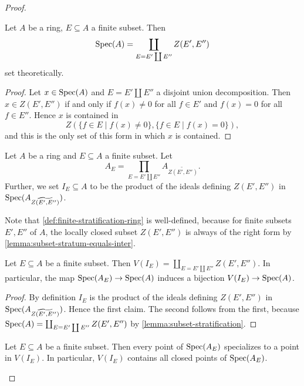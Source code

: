 \begin{proof}
\begin{lemma}
    Let $A$ be a ring, $E \subseteq A$ a finite subset. Then
    \[
        \mathrm{Spec}(A) = \coprod_{E = E' \coprod E''} Z(E', E'')
    \] set theoretically.
    \label{lemma:subset-stratification}
\end{lemma}

\begin{proof}
    Let $x \in \mathrm{Spec}(A)$ and $E = E' \coprod E''$ a disjoint union decomposition. Then
    $x \in Z(E', E'')$ if and only if $f(x) \neq 0$ for all $f \in E'$ and $f(x) = 0$
    for all $f \in E''$. Hence $x$ is contained in
    \[
    Z(\{ f \in E  \mid f(x) \neq 0\}, \{f \in E  \mid f(x) = 0\})
    ,\] and this is the only set of this form in which $x$ is contained.
\end{proof}

\begin{definition}
    Let $A$ be a ring and $E \subseteq A$ a finite subset. Let
    \[
    A_{E} = \prod_{E = E' \coprod E''} A_{\widetilde{Z(E', E'')}}
    .\]
    Further, we set $I_E \subseteq A$ to be the product of the ideals
    defining $Z(E', E'')$ in $\mathrm{Spec}(A_{\widetilde{Z(E', E'')}})$.
    \label{def:finite-stratification-ring}
\end{definition}

Note that \ref{def:finite-stratification-ring} is well-defined, because for finite
subsets $E', E''$ of $A$, the locally closed subset $Z(E', E'')$ is always
of the right form by \ref{lemma:subset-stratum-equals-inter}.

\begin{lemma}
    Let $E \subseteq A$ be a finite subset. Then
    $V(I_E) = \coprod_{E = E' \coprod E''} Z(E', E'')$. In particular,
    the map $\mathrm{Spec}(A_E) \to \mathrm{Spec}(A)$ induces a bijection $V(I_E) \to \mathrm{Spec}(A)$.
    \label{lemma:finite-stratification-ideal-bijection}
\end{lemma}

\begin{proof}
    By definition $I_E$ is the product of the ideals defining $Z(E', E'')$ in
    $\mathrm{Spec}(A_{\widetilde{Z(E', E'')}})$. Hence the first claim. The second
    follows from the first, because $\mathrm{Spec}(A) = \coprod_{E = E' \coprod E''} Z(E', E'')$ by
    \ref{lemma:subset-stratification}.
\end{proof}

\begin{lemma}
    Let $E \subseteq A$ be a finite subset. Then every point of $\mathrm{Spec}(A_E)$ specializes
    to a point in $V(I_E)$. In particular, $V(I_E)$ contains all closed points of $\mathrm{Spec}(A_E)$.%
    \label{lemma:finite-stratification-closed-points}
\end{lemma}


\end{proof}

